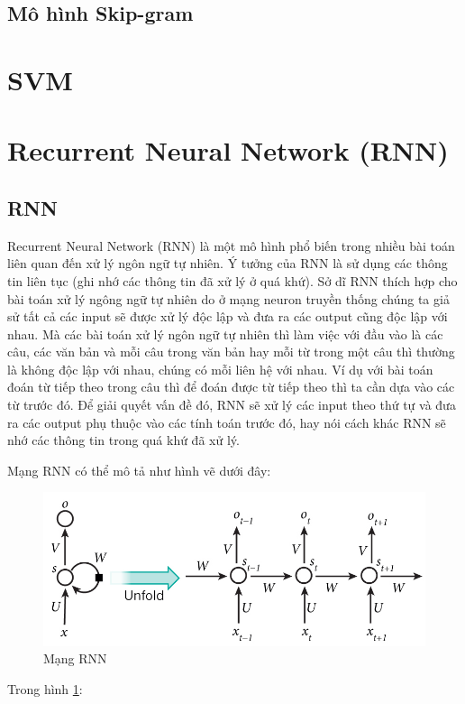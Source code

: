 \documentclass[a4paper,12pt]{report}
\begin{document}
\subsection{Mô hình Skip-gram} 

\section{SVM}

\section{Recurrent Neural Network (RNN)}
\subsection{RNN}
Recurrent Neural Network (RNN) là một mô hình phổ biến trong nhiều bài toán liên quan đến xử lý ngôn ngữ tự nhiên. Ý tưởng của RNN là sử dụng các thông tin liên tục (ghi nhớ các thông tin đã xử lý ở quá khứ). Sở dĩ RNN thích hợp cho bài toán xử lý ngông ngữ tự nhiên do ở mạng neuron truyền thống chúng ta giả sử tất cả các input sẽ được xử lý độc lập và đưa ra các output cũng độc lập với nhau. Mà các bài toán xử lý ngôn ngữ tự nhiên thì làm việc với đầu vào là các câu, các văn bản và mỗi câu trong văn bản hay mỗi từ trong một câu thì thường là không độc lập với nhau, chúng có mỗi liên hệ với nhau. Ví dụ với bài toán đoán từ tiếp theo trong câu thì để đoán được từ tiếp theo thì ta cần dựa vào các từ trước đó. Để giải quyết vấn đề đó, RNN sẽ xử lý các input theo thứ tự và đưa ra các output phụ thuộc vào các tính toán trước đó, hay nói cách khác RNN sẽ nhớ các thông tin trong quá khứ đã xử lý.
\par Mạng RNN có thể mô tả như hình vẽ dưới đây: 
\begin{figure}[H]
\centering
\includegraphics[scale=0.5]{rnn.jpg}
\caption{Mạng RNN}
\label{img_rnn}
\end{figure}
Trong hình \ref{img_rnn}:
\end{document}
